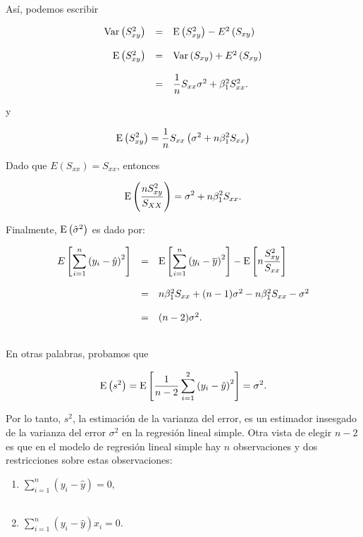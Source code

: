 Así, podemos escribir

$$
\begin{array}{rcl}
    \Var\left(S_{xy}^2\right) &=& \E\left(S_{xy}^2\right)-E^2\left(S_{xy}\right)\\\\
    \E\left(S_{xy}^2\right) &=& \Var\left(S_{xy}\right)+E^2\left(S_{xy}\right)\\\\
			    &=& \dfrac{1}{n}S_{xx}\sigma^2+\beta_{1}^2 S^2_{xx}.

\end{array}
$$

y

$$
\mathop{\mbox{\normalfont E}}\nolimits\left(S_{xy}^2\right)=\dfrac{1}{n}S_{xx}\left(\sigma^2+n\beta_{1}^2 S_{xx}\right)
$$

Dado que $E\left(S_{xx}\right)=S_{xx}$, entonces

$$
\mathop{\mbox{\normalfont E}}\nolimits\left(\dfrac{nS_{xy}^2}{S_{XX}}\right)=\sigma^2+n\beta_{1}^2 S_{xx}.
$$

Finalmente, $\mathop{\mbox{\normalfont E}}\nolimits\left(\hat{\sigma}^2\right)$ es dado por:

$$
\begin{array}{rcl}
    E\left[\displaystyle\sum_{i=1}^n \left(y_i-\hat{y}\right)^2\right] &=& \mathop{\mbox{\normalfont E}}\nolimits\left[\displaystyle\sum_{i=1}^n\left(y_i-\overline{y}\right)^2\right]-\mathop{\mbox{\normalfont E}}\nolimits\left[n\dfrac{S_{xy}^2}{S_{xx}}\right]\\\\
    &=&n\beta_1^2 S_{xx}+(n-1)\sigma^2-n\beta_1^2S_{xx}-\sigma^2\\\\
								      &=&(n-2)\sigma^2.\\\\
\end{array}
$$

En otras palabras, probamos que

\begin{tcolorbox}
    $$\mathop{\mbox{\normalfont E}}\nolimits\left(s^2\right)=\mathop{\mbox{\normalfont E}}\nolimits\left[\dfrac{1}{n-2}\sum_{i=1}^2\left(y_i-\hat{y}\right)^2\right]=\sigma^2.$$
\end{tcolorbox}

Por lo tanto, $s^2$, la estimación de la varianza del error, es un estimador insesgado de la varianza del error $\sigma^2$ en la regresión lineal simple. Otra vista de elegir $n - 2$ es que en el modelo de regresión lineal simple hay $n$ observaciones y dos restricciones sobre estas observaciones:

\begin{enumerate}
    \item $\displaystyle\sum_{i=1}^n \left(y_i-\hat{y}\right)=0$,\\\\
    \item $\displaystyle\sum_{i=1}^n \left(y_i-\hat{y}\right)x_i=0$.\\\\
\end{enumerate}

